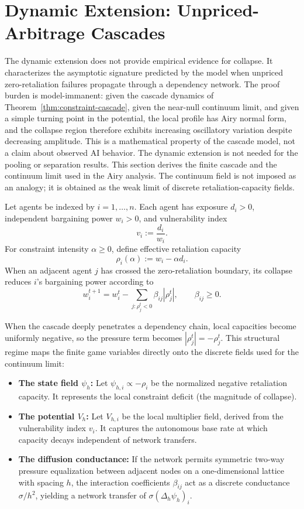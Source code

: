 \documentclass[review,authoryear]{elsarticle}
\theoremstyle{definition}
\theoremstyle{plain}
\begin{document}
\section{Dynamic Extension: Unpriced-Arbitrage Cascades}
\label{sec:cascade}

The dynamic extension does not provide empirical evidence for collapse.  It characterizes the asymptotic signature predicted by the model when unpriced zero-retaliation failures propagate through a dependency network.  The proof burden is model-immanent: given the cascade dynamics of Theorem~\ref{thm:constraint-cascade}, given the near-null continuum limit, and given a simple turning point in the potential, the local profile has Airy normal form, and the collapse region therefore exhibits increasing oscillatory variation despite decreasing amplitude.  This is a mathematical property of the cascade model, not a claim about observed AI behavior.  The dynamic extension is not needed for the pooling or separation results.  This section derives the finite cascade and the continuum limit used in the Airy analysis.  The continuum field is not imposed as an analogy; it is obtained as the weak limit of discrete retaliation-capacity fields.

Let agents be indexed by $i=1,\ldots,n$.  Each agent has exposure $d_i>0$, independent bargaining power $w_i>0$, and vulnerability index
\[
v_i:=\frac{d_i}{w_i}.
\]
For constraint intensity $\alpha\geq0$, define effective retaliation capacity
\[
\rho_i(\alpha):=w_i-\alpha d_i.
\]
When an adjacent agent $j$ has crossed the zero-retaliation boundary, its collapse reduces $i$'s bargaining power according to
\[
w_i^{t+1}
=
w_i^t-\sum_{j:\rho_j^t<0}\beta_{ij}|\rho_j^t|,
\qquad
\beta_{ij}\geq0 .
\]

When the cascade deeply penetrates a dependency chain, local capacities become uniformly negative, so the pressure term becomes $|\rho_j^t| = -\rho_j^t$. This structural regime maps the finite game variables directly onto the discrete fields used for the continuum limit:
\begin{itemize}
    \item \textbf{The state field $\psi_h$:} Let $\psi_{h,i} \propto -\rho_i$ be the normalized negative retaliation capacity. It represents the local constraint deficit (the magnitude of collapse).
    \item \textbf{The potential $V_h$:} Let $V_{h,i}$ be the local multiplier field, derived from the vulnerability index $v_i$. It captures the autonomous base rate at which capacity decays independent of network transfers.
    \item \textbf{The diffusion conductance:} If the network permits symmetric two-way pressure equalization between adjacent nodes on a one-dimensional lattice with spacing $h$, the interaction coefficients $\beta_{ij}$ act as a discrete conductance $\sigma/h^2$, yielding a network transfer of $\sigma(\Delta_h\psi_h)_i$.
\end{itemize}
\end{document}
